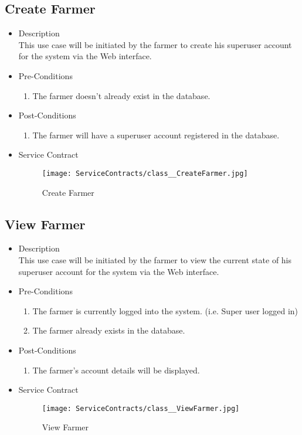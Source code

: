 \documentclass[11pt,fleqn]{book} %
\begin{document}
\subsection{Create Farmer}
\begin{itemize}
	\item Description\\
	This use case will be initiated by the farmer to create his superuser account for the system via the Web interface.
	\item Pre-Conditions
	\begin{enumerate}
		\item The farmer doesn’t already exist in the database.
	\end{enumerate}
	\item Post-Conditions
	\begin{enumerate}
		\item The farmer will have a superuser account registered in the database.
	\end{enumerate}
	\item Service Contract
	\begin{figure}
		\texttt{[image: ServiceContracts/class\_\_CreateFarmer.jpg]}
		\caption{Create Farmer}
	\end{figure}
\end{itemize}

\subsection{View Farmer}
\begin{itemize}
	\item Description\\
	This use case will be initiated by the farmer to view the current state of his superuser account for the system via the Web interface.
	\item Pre-Conditions
	\begin{enumerate}
		\item The farmer is currently logged into the system. (i.e. Super user logged in)
		\item The farmer already exists in the database.					
	\end{enumerate}
	\item Post-Conditions
	\begin{enumerate}
		\item The farmer’s account details will be displayed.
	\end{enumerate}
	\item Service Contract
	\begin{figure}
		\texttt{[image: ServiceContracts/class\_\_ViewFarmer.jpg]}
		\caption{View Farmer}
	\end{figure}
\end{itemize}
\end{document}
